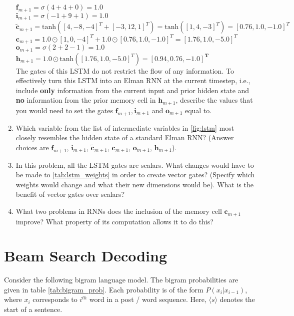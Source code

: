 \documentclass[12pt, letterpaper]{article}
\begin{document}
\begin{enumerate}
$\boldsymbol{f}_{m+1} = \sigma(4 + 4 + 0) = 1.0$ \\
\indent $\boldsymbol{i}_{m+1} = \sigma(-1 + 9 + 1) = 1.0$ \\
\indent $\boldsymbol{\tilde{c}}_{m+1} = \text{tanh}([4, -8, -4]^T + [-3, 12, 1]^T) = \text{tanh}([1,4,-3]^T) = [0.76, 1.0, -1.0]^T$\\
\indent $\boldsymbol{c}_{m+1} = 1.0 \odot [1,0,-4]^T + 1.0 \odot [0.76, 1.0, -1.0]^T = [1.76, 1.0, -5.0]^T $ \\
\indent $\boldsymbol{o}_{m+1} = \sigma(2 + 2 - 1) = 1.0$\\
\indent $\boldsymbol{h}_{m+1} = 1.0 \odot \text{tanh}([1.76, 1.0, -5.0]^T) = \mathbf{[0.94, 0.76, -1.0]^T}$\\

The gates of this LSTM do not restrict the flow of any information. To effectively turn this LSTM into an Elman RNN at the current timestep, i.e., include \textbf{only} information from the current input and prior hidden state and \textbf{no} information from the prior memory cell in $\boldsymbol{h}_{m+1}$, describe the values that you would need to set the gates $\boldsymbol{f}_{m+1}, \boldsymbol{i}_{m+1}$ and $\boldsymbol{o}_{m+1}$ equal to.

\item Which variable from the list of intermediate variables in \autoref{fig:lstm} most closely resembles the hidden state of a standard Elman RNN? (Answer choices are $\boldsymbol{f}_{m+1}$, $\boldsymbol{i}_{m+1}$, $\boldsymbol{\tilde c}_{m+1}$, $\boldsymbol{c}_{m+1}$, $\boldsymbol{o}_{m+1}$, $\boldsymbol{h}_{m+1}$).

\item In this problem, all the LSTM gates are scalars. What changes would have to be made to \autoref{tab:lstm_weights} in order to create vector gates? (Specify which weights would change and what their new dimensions would be). What is the benefit of vector gates over scalars?

\item What two problems in RNNs does the inclusion of the memory cell $\boldsymbol{c}_{m+1}$ improve? What property of its computation allows it to do this?

\end{enumerate}


\section{Beam Search Decoding}
Consider the following bigram language model. The bigram probabilities are given in table \ref{tab:bigram_prob}. Each probability is of the form $P(x_i|x_{i-1})$, where $x_i$ corresponds to $i^{th}$ word in a post / word sequence. Here, $\langle s \rangle$ denotes the start of a sentence.
\end{document}
